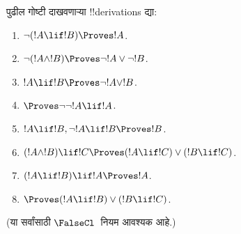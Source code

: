 \documentclass[../../../include/open-logic-section]{subfiles}
\begin{document}
\begin{prob}
पुढील गोष्टी दाखवणाऱ्या !!{derivation}s द्या:
\begin{enumerate}
\item $\lnot(!A \lif !B) \Proves !A$.
\item $\lnot(!A \land !B) \Proves \lnot !A \lor \lnot !B$.
\item $!A \lif !B \Proves \lnot !A \lor !B$.
\item $\Proves \lnot \lnot !A \lif !A$.
\item $!A \lif !B, \lnot !A \lif !B \Proves !B$.
\item $(!A \land !B) \lif !C \Proves (!A \lif !C) \lor (!B \lif !C)$.
\item $(!A \lif !B) \lif !A \Proves !A$.
\item $\Proves (!A \lif !B) \lor (!B \lif !C)$.
\end{enumerate}
(या सर्वांसाठी $\FalseCl$~नियम आवश्यक आहे.)
\end{prob}
\end{document}
